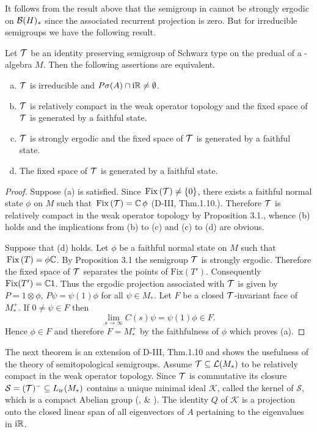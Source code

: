 It follows from the result above that the semigroup in \citet{evans:1977} cannot be strongly ergodic on $\mathcal{B}(H)_{*}$ since the associated recurrent projection is zero.
But for irreducible semigroups we have the following result.
\begin{proposition}\label{prop:d4-3.4}
Let $\mathcal{T}$ be an identity preserving semigroup of Schwarz type on the predual of a \WA-algebra $M$.
Then the following assertions are equivalent.
\begin{enumerate}[(a)]
\item
$\mathcal{T}$ is irreducible and $P\sigma(A) \cap \mathrm{i}\mathbb{R} \neq \emptyset$.

\item
$\mathcal{T}$ is relatively compact in the weak operator topology and the fixed space of\/ $\mathcal{T}$ is generated by a faithful state.

\item
$\mathcal{T}$ is strongly ergodic and the fixed space of\/ $\mathcal{T}$ is generated by a faithful state.

\item
The fixed space of\/ $\mathcal{T}$ is generated by a faithful state.
\end{enumerate}
\end{proposition}
\begin{proof}
Suppose (a) is satisfied.
Since $\mathop{}\mathrm{Fix}\left(\mathcal{T}\right) \neq \{0\}$, there exists a faithful normal state $\phi$ on $M$ such that $\mathop{}\mathrm{Fix}\left(\mathcal{T}\right) = \mathbb{C} \,\phi$ (D-III, Thm.1.10.).
Therefore $\mathcal{T}$ is relatively compact in the weak operator topology by Proposition 3.1., whence (b) holds and the  implications from (b) to (c) and (c) to (d) are obvious.

Suppose that (d) holds.
Let $\phi$ be a faithful normal state on $M$ such that $\mathop{}\mathrm{Fix}\left(T\right) = \phi\mathbb{C}$.
By Proposition 3.1 the semigroup $\mathcal{T}$ is strongly ergodic.
Therefore the fixed space of\/ $\mathcal{T}$ separates the points of $\text{Fix}(T')$.
Consequently $\text{Fix}(T') = \mathbb{C}1$.
Thus the ergodic projection associated with $\mathcal{T}$ is given by $P = 1 \otimes \phi$, \ie $P\psi = \psi(1)\phi$ for all $\psi \in M_{*}$.
Let $F$ be a closed $\mathcal{T}$-invariant face of $M_{*}^{+}$.
If $0 \neq \psi \in F$ then
\[
\lim_{s \to \infty} C(s)\psi = \psi(1)\phi \in F.
\]
Hence $\phi \in F$ and therefore $F = M_{*}^{+}$ by the faithfulness of $\phi$ which proves (a).
\end{proof}
The next theorem is an extension of D-III, Thm.1.10 and shows the usefulness of the theory of semitopological semigroups.
Assume $\mathcal{T} \subseteq \mathcal{L}(M_{*})$ to be relatively compact in the weak operator topology. 
Since $\mathcal{T}$ is commutative its closure $\mathcal{S}  = (\mathcal{T})^{-} \subseteq L_{w}(M_{*})$ contains a unique minimal ideal $\mathcal{K}$, called the kernel of $\mathcal{S}$, which is a compact Abelian group (\citet{deleeuwglicksberg:1961}, \citet{junghenn:1971} \& \citet[§ 2.4]{krengel:1985}).
The identity $Q$ of $\mathcal{K}$ is a projection onto the closed linear span of all eigenvectors of $ A $ pertaining to the eigenvalues in $ \mathrm{i} \mathbb{R} $. 

